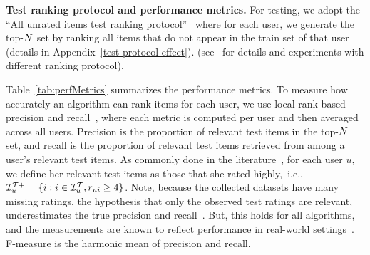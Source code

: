 \noindent \textbf{Test ranking protocol and performance metrics. }For testing, we adopt the ``All unrated items test ranking protocol''~\cite{steck2013evaluation,vargas2014improving} where for each user, we generate the top-$\size$ set by  ranking all items that do not appear in the train set of that user \iffullpaper 
(details in Appendix~\ref{test-protocol-effect}).
\else 
(see~\cite{ourFullVersion} for details  and  experiments with different ranking protocol).
\fi %
 
Table~\ref{tab:perfMetrics} summarizes the performance metrics. To measure how accurately an algorithm can rank items for each user,  we use local rank-based precision and recall~\cite{agarwal_chen_2016,vargas2014improving,steck2013evaluation}, where each metric is computed per user and then averaged across all users. Precision is the proportion of relevant test items in the top-$\size$ set, and recall is the proportion of relevant test items retrieved from among a user's relevant test items. As commonly done in the literature~\cite{agarwal_chen_2016,niemann2013new}, for each user $u$, we define her relevant test items as those that she rated highly,~i.e., $ \mathcal{I}_{u}^{\mathcal{T} +} = \{i: i \in \mathcal{I}_{u}^{\mathcal{T}} ,  r_{ui} \geq 4\}$. Note,  because the collected datasets have many missing ratings, the hypothesis that only the observed test ratings are relevant,  underestimates the true precision and recall~\cite{steck2013evaluation}. But,  this  holds  for all algorithms, and the  measurements are known to reflect performance in real-world settings~\cite{steck2013evaluation}. F-measure is the harmonic mean of precision and recall.
\iffalse
For algorithms that re-rank rating-prediction models, we also report the prediction  metric (Prediction@$\size$) that is known to be correlated with precision~\cite{adomavicius2011maximizing}. It is the average predicted rating value of the top-$\size$ set, according to the  underlying rating-prediction model. It measures the deviation of any top-$\size$ from the default greedy strategy of a rating prediction model~\cite{adomavicius2011maximizing,ho2014likes}. %
\fi



